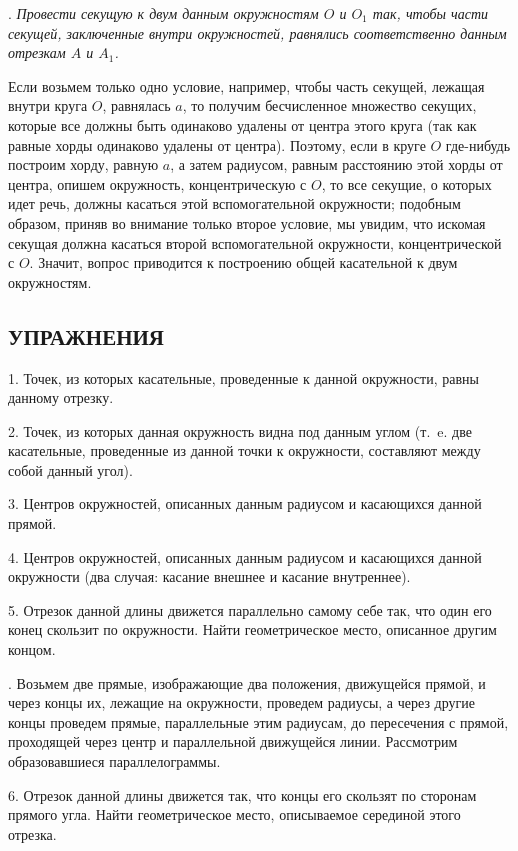 \documentclass[oneside]{book}
\begin{document}
.
\emph{Провести секущую к двум данным окружностям $O$ и $O_1$ так, чтобы части секущей, заключенные внутри окружностей, равнялись соответственно данным отрезкам $A$ и $A_1$.}

Если возьмем только одно условие, например, чтобы часть секущей, лежащая внутри круга $O$, равнялась $a$, то получим бесчисленное множество секущих, которые все должны быть одинаково удалены от центра этого круга (так как равные хорды одинаково удалены от центра).
Поэтому, если в круге $O$ где-нибудь построим хорду, равную $a$, а затем радиусом, равным расстоянию этой хорды от центра, опишем окружность, концентрическую с $O$, то все секущие, о которых идет речь, должны касаться этой вспомогательной окружности;
подобным образом, приняв во внимание только второе условие, мы увидим, что искомая секущая должна касаться второй вспомогательной окружности, концентрической с $O$.
Значит, вопрос приводится к построению общей касательной к двум окружностям.

\subsection*{УПРАЖНЕНИЯ}


1.
Точек, из которых касательные, проведенные к данной окружности, равны данному отрезку.

2.
Точек, из которых данная окружность видна под данным углом (т.~e.
две касательные, проведенные из данной точки к окружности, составляют между собой данный угол).

3.
Центров окружностей, описанных данным радиусом и касающихся данной прямой.

4.
Центров окружностей, описанных данным радиусом и касающихся данной окружности (два случая:
касание внешнее и касание внутреннее).

5.
Отрезок данной длины движется параллельно самому себе так, что один его конец скользит по окружности.
Найти геометрическое место, описанное другим концом.

.
Возьмем две прямые, изображающие два положения, движущейся прямой, и через концы их, лежащие на окружности, проведем радиусы, а через другие концы проведем прямые, параллельные этим радиусам, до пересечения с прямой, проходящей через центр и параллельной движущейся линии.
Рассмотрим образовавшиеся параллелограммы.

6.
Отрезок данной длины движется так, что концы его скользят по сторонам прямого угла.
Найти геометрическое место, описываемое серединой этого отрезка.
\end{document}
